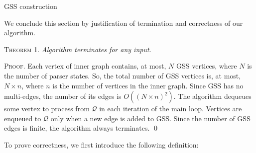 \begin{algorithm}[!ht]
\begin{algorithmic}[1]
\caption{GSS construction}
\label{gss_construction}
  \Else
    \EndFor
  \EndIf
\EndFunction

    \EndIf
      \EndFor
    \EndIf
  \EndIf
\EndFunction
\end{algorithmic}
\end{algorithm}

We conclude this section by justification of termination and correctness of our algorithm.

\textsc{Theorem 1.}
\textit{Algorithm terminates for any input.}

\textsc{Proof.}
Each vertex of inner graph contains, at most, 
$N$ GSS vertices, where $N$ is the number of parser states. So, the total number of 
GSS vertices is, at most, $N\times n$, where $n$ is the number of vertices in the inner graph. 
Since GSS has no multi-edges, the number of its edges is $O((N\times n)^2)$. The algorithm 
dequeues some vertex to process from $\mathcal Q$ in each iteration of the 
main loop. Vertices are enqueued to $\mathcal Q$ only when a new edge is added to GSS. Since the number of 
GSS edges is finite, the algorithm always terminates. \qed

To prove correctness, we first introduce the following definition:

